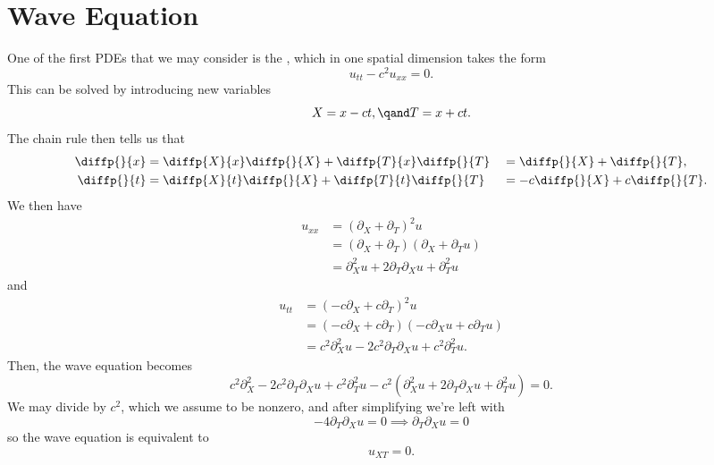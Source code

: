 \documentclass[fleqn]{NotesClass}
\begin{document}
    \section{Wave Equation}
    One of the first PDEs that we may consider is the , which in one spatial dimension takes the form
    \begin{equation}
        u_{tt} - c^2 u_{xx} = 0.
    \end{equation}
    This can be solved by introducing new variables
    \begin{equation}
        X = x - ct, \qand T = x + ct.
    \end{equation}
    The chain rule then tells us that
    \begin{alignat}{3}
        \diffp{}{x} &= \diffp{X}{x} \diffp{}{X} + \diffp{T}{x} \diffp{}{T} &&= \diffp{}{X} + \diffp{}{T},\\
        \diffp{}{t} &= \diffp{X}{t} \diffp{}{X} + \diffp{T}{t} \diffp{}{T} &&= -c\diffp{}{X} + c\diffp{}{T}.
    \end{alignat}
    We then have
    \begin{align}
        u_{xx} &= (\partial_X + \partial_T)^2u\\
        &= (\partial_X + \partial_T)(\partial_X + \partial_T u)\\
        &= \partial_X^2 u + 2\partial_T\partial_X u + \partial_T^2 u
    \end{align}
    and
    \begin{align}
        u_{tt} &= (-c\partial_X + c\partial_T)^2u\\
        &= (-c\partial_X + c\partial_T)(-c\partial_X u + c\partial_T u)\\
        &= c^2 \partial_X^2 u - 2 c^2 \partial_T \partial_X u + c^2 \partial_T^2 u.
    \end{align}
    Then, the wave equation becomes
    \begin{equation}
        c^2 \partial_X^2 - 2 c^2 \partial_T \partial_X u + c^2 \partial_T^2 u - c^2(\partial_X^2 u + 2\partial_T \partial_X u + \partial_T^2 u) = 0.
    \end{equation}
    We may divide by \(c^2\), which we assume to be nonzero, and after simplifying we're left with
    \begin{equation}
        -4 \partial_T \partial_X u = 0 \implies \partial_T \partial_X u = 0
    \end{equation}
    so the wave equation is equivalent to
    \begin{equation}
        u_{XT} = 0.
    \end{equation}
\end{document}
